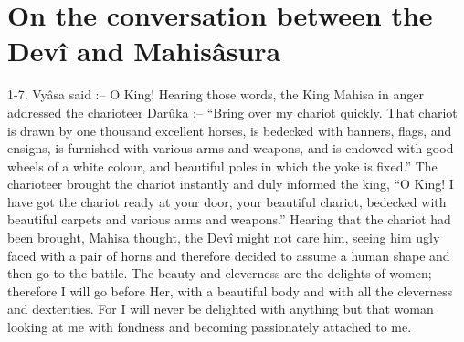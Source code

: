﻿\chapter{On the conversation between the Dev\^i and Mahis\^asura}

1-7. Vy\^asa said :-- O King! Hearing those words, the King Mahisa in anger addressed the charioteer Dar\^uka :-- ``Bring over my chariot quickly. That chariot is drawn by one thousand excellent horses, is bedecked with banners, flags, and ensigns, is furnished with various arms and weapons, and is endowed with good wheels of a white colour, and beautiful poles in which the yoke is fixed.'' The charioteer brought the chariot instantly and duly informed the king, ``O King! I have got the chariot ready at your door, your beautiful chariot, bedecked with beautiful carpets and various arms and weapons.'' Hearing that the chariot had been brought, Mahisa thought, the Dev\^i might not care him, seeing him ugly faced with a pair of horns and therefore decided to assume a human shape and then go to the battle. The beauty and cleverness are the delights of women; therefore I will go before Her, with a beautiful body and with all the cleverness and dexterities. For I will never be delighted with anything but that woman looking at me with fondness and becoming passionately attached to me.

